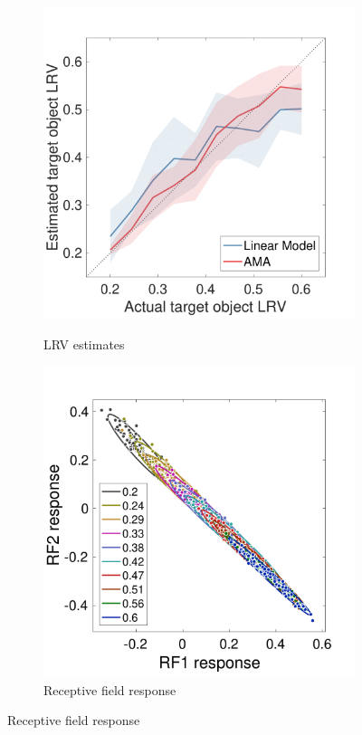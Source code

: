 \documentclass{jov}
\begin{document}
\begin{figure}
\centering
            \begin{subfigure}[b]{0.25 \textwidth}
        \caption{LRV estimates}
        \includegraphics[width=\textwidth, trim={0 0 0 1.3cm},clip]{../FiguresDraft4/Figure12/Figure12_a.pdf}
        \label{fig:case3Estimates}
    \end{subfigure} 
        \begin{subfigure}[b]{0.26\textwidth}
        \caption{Receptive field response}
        \includegraphics[width=\textwidth, trim={0 3mm 0 15mm},clip]{../FiguresDraft4/Figure12/Figure12_b.pdf}

\end{subfigure}
\end{figure}
\end{document}
